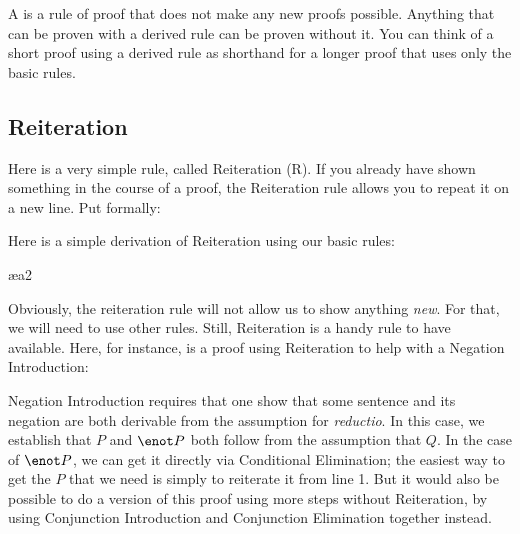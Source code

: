 A  is a rule of proof that does not make any new proofs possible. Anything that can be proven with a derived rule can be proven without it. You can think of a short proof using a derived rule as shorthand for a longer proof that uses only the basic rules. 


\subsection{Reiteration}
\label{sec:reiteration}

Here is a very simple rule, called Reiteration (R). If you already have shown something in the course of a proof, the Reiteration rule allows you to repeat it on a new line. Put formally:

\begin{ndproof}
	\metaA{}
	\metaA{} 
\end{ndproof}

Here is a simple derivation of Reiteration using our basic rules:

\begin{ndproof}
	\metaA{}
	 
	\metaA{}  \ae{a2}
\end{ndproof}

Obviously, the reiteration rule will not allow us to show anything \emph{new}. For that, we will need to use other rules. Still, Reiteration is a handy rule to have available. Here, for instance, is a proof using Reiteration to help with a Negation Introduction:

\begin{ndproof}
	 
	\open
		 
	\close
\end{ndproof}

Negation Introduction requires that one show that some sentence and its negation are both derivable from the assumption for \emph{reductio}. In this case, we establish that $P$ and $\enot P$ both follow from the assumption that $Q$. In the case of $\enot P$, we can get it directly via Conditional Elimination; the easiest way to get the $P$ that we need is simply to reiterate it from line 1. But it would also be possible to do a version of this proof using more steps without Reiteration, by using Conjunction Introduction and Conjunction Elimination together instead.

